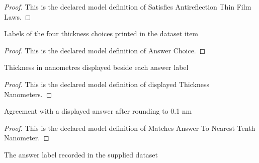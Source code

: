 \begin{proof}
  This is the declared model definition of Satisfies Antireflection Thin Film Laws.
\end{proof}
\begin{definition}
  \label{def:physics:phyx-mini-0128:phyxminiproblems-problemphyxmini0128-answerchoice}
  Labels of the four thickness choices printed in the dataset item
\end{definition}
\begin{proof}
  This is the declared model definition of Answer Choice.
\end{proof}
\begin{definition}
  \label{def:physics:phyx-mini-0128:phyxminiproblems-problemphyxmini0128-displayedthicknessnanometers}
  Thickness in nanometres displayed beside each answer label
\end{definition}
\begin{proof}
  This is the declared model definition of displayed Thickness Nanometers.
\end{proof}
\begin{definition}
  \label{def:physics:phyx-mini-0128:phyxminiproblems-problemphyxmini0128-matchesanswertonearesttenthnanometer}
  Agreement with a displayed answer after rounding to 0.1 nm
\end{definition}
\begin{proof}
  This is the declared model definition of Matches Answer To Nearest Tenth Nanometer.
\end{proof}
\begin{definition}
  \label{def:physics:phyx-mini-0128:phyxminiproblems-problemphyxmini0128-recordeddatasetanswer}
  The answer label recorded in the supplied dataset
\end{definition}
